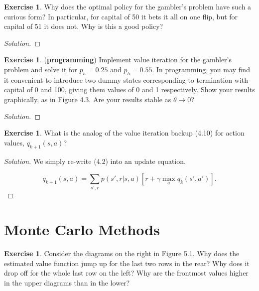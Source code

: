 \documentclass[oneside,11pt]{article}
\theoremstyle{definition}
\newtheorem{exer}[thm]{Exercise}
\newenvironment{solution}
{\renewcommand\qedsymbol{$\blacksquare$}\begin{proof}[Solution]} {\end{proof}}
\begin{document}
\begin{exer}
Why does the optimal policy for the gambler's problem have such a curious form? In particular, for capital of 50 it bets it all on one flip, but for capital of 51 it does not. Why is this a good policy?
\end{exer}

\begin{shaded}
\begin{solution} 


\end{solution} 
\end{shaded}


\begin{exer}
(\textbf{programming}) Implement value iteration for the gambler's problem and solve it for $p_h = 0.25$ and $p_h = 0.55$. In programming, you may find it convenient to introduce two dummy states corresponding to termination with capital of 0 and 100, giving them values of 0 and 1 respectively. Show your results graphically, as in Figure 4.3. Are your results stable as $\theta \to 0$?
\end{exer}

\begin{shaded}
\begin{solution} 


\end{solution} 
\end{shaded}


\begin{exer}
What is the analog of the value iteration backup (4.10) for action values, $q_{k+1}(s, a)$?
\end{exer}

\begin{shaded}
\begin{solution} 

We simply re-write (4.2) into an update equation.

\[ q_{k+1}(s,a) = \sum_{s',r} p(s',r | s,a ) \left [ r + \gamma \max_a q_{k}(s',a') \right ].  \]

\end{solution} 
\end{shaded}

\section{Monte Carlo Methods}

\begin{exer}
Consider the diagrams on the right in Figure 5.1. Why does the estimated value function jump up for the last two rows in the rear? Why does it drop off for the whole last row on the left? Why are the frontmost values higher in the upper diagrams than in the lower?
\end{exer}
\end{document}
